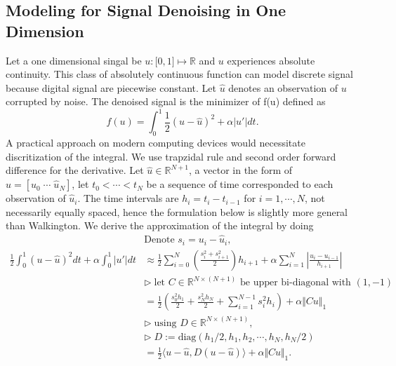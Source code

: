 \documentclass[]{article}
\theoremstyle{definition}
\numberwithin{equation}{subsection}
\begin{document}
    \subsection{Modeling for Signal Denoising in One Dimension}
        Let a one dimensional singal be $u: \mathbb [0, 1]\mapsto \mathbb R$ and $u$ experiences absolute continuity. 
        This class of absolutely continuous function can model discrete signal because digital signal are piecewise constant. 
        Let $\hat u$ denotes an observation of $u$ corrupted by noise. 
        The denoised signal is the minimizer of f(u) defined  as
        \[
            f(u) = \int_0^1 \frac{1}{2} 
            (u - \hat u)^2 + \alpha |u'|dt. 
        \]
        A practical approach on modern computing devices would necessitate discritization of the integral. 
        We use trapzidal rule and second order forward difference for the derivative. 
        Let $\hat u \in \mathbb R^{N+1}$, a vector in the form of $\hat u = [\hat u_0\; \cdots \; \hat u_{N}]$, let $t_0<  \cdots <t_N$ be a sequence of time corresponded to each observation of $\hat u_i$. 
        The time intervals are $h_i = t_{i} - t_{i-1}$ for $i=1, \cdots, N$, not necessarily equally spaced, hence the formulation below is slightly more general than Walkington\cite{noel_nesterovs_nodate}. 
        We derive the approximation of the integral by doing
        \begin{align*}
            & \text{Denote } s_i = u_i - \hat u_i, 
            \\
            \frac{1}{2}\int_{0}^{1} (u - \hat u)^2 dt + 
            \alpha \int_0^1 |u'| dt
            &\approx
            \frac{1}{2}
            \sum_{i = 0}^{N}
            \left(
                \frac{s_i^2 + s_{i + 1}^2}{2}
            \right)h_{i + 1}
            + 
            \alpha
            \sum_{i = 1}^{N}
            \left|
                \frac{u_{i} - u_{i - 1}}{h_{i + 1}}
            \right|
            \\
            & \triangleright\; \text{let } 
            C\in \mathbb R^{N\times (N + 1)} \text{ be upper bi-diagonal with }(1, -1)
            \\
            &= \frac{1}{2}\left(
                \frac{s_0^2h_1}{2} + \frac{s_N^2h_N}{2}
                + 
                \sum_{i = 1}^{N - 1}s_i^2 h_i
            \right) + \alpha\Vert Cu\Vert_1
            \\
            & 
            \triangleright \; \text{using } D\in \mathbb R^{N \times (N + 1)},
            \\
            & \triangleright\; D := \text{diag}(h_1/2, h_1, h_2, \cdots, h_N, h_N/2)
            \\
            &= 
            \frac{1}{2}\langle u - \hat u, D(u - \hat u)\rangle + \alpha \Vert Cu\Vert_1. 
        \end{align*}
\end{document}
